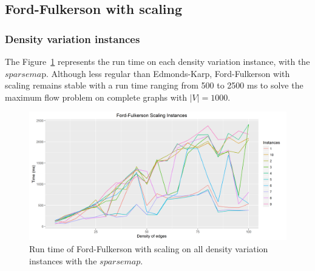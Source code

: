 \subsection{Ford-Fulkerson with scaling}
\subsubsection{Density variation instances}
The Figure~\ref{fig:FFmean} represents the run time on each density variation instance, with the $sparsema$p. Although less regular than Edmonds-Karp, Ford-Fulkerson with scaling remains stable with a run time ranging from 500 to 2500 ms to solve the maximum flow problem on complete graphs with $|V|=1000$.
\begin{figure}[H]
\begin{center}
\includegraphics[scale=0.5]{images/FFmean.png}
\caption{Run time of Ford-Fulkerson with scaling on all density variation instances with the $sparse map$.}
\label{fig:FFmean}
\end{center}
\end{figure}
